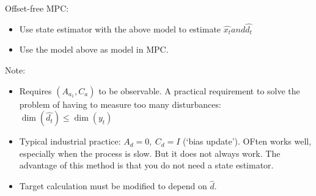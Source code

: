 \documentclass{article}
\begin{document}
Offset-free MPC: 
\begin{itemize}
  \item Use state estimator with the above model to estimate $\hat{x_t} and \hat{d_t}$
  \item Use the model above as model in MPC. 
\end{itemize}
Note:
\begin{itemize}
  \item Requires $(A_{a_1}, C_a)$ to be observable. A practical requirement to solve the problem of having
  to measure too many disturbances: $\dim( \hat{d_t}) \leq \dim(y_t)$
  \item Typical industrial practice: $A_d = 0,\  C_d = I$ (`bias update'). OFten works well, especially when 
  the process is slow. But it does not always work. 
  The advantage of this method is that you do not need a state estimator. 
  \item Target calculation must be modified to depend on $\hat{d}$. 
\end{itemize}
\end{document}
